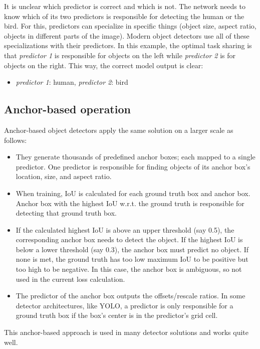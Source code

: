 It is unclear which predictor is correct and which is not. The network needs to know which of its two predictors is responsible for detecting the human or the bird. For this, predictors can specialize in specific things (object size, aspect ratio, objects in different parts of the image). Modern object detectors use all of these specializations with their predictors. In this example, the optimal task sharing is that \textit{predictor 1} is responsible for objects on the left while \textit{predictor 2} is for objects on the right. This way, the correct model output is clear:

\begin{itemize}
  \item \textit{predictor 1}: human, \textit{predictor 2}: bird
\end{itemize}

\subsection{Anchor-based operation}

Anchor-based object detectors apply the same solution on a larger scale as follows:

\begin{itemize}
  \item They generate thousands of predefined anchor boxes; each mapped to a single predictor. One predictor is responsible for finding objects of its anchor box's location, size, and aspect ratio.
  \item When training, IoU is calculated for each ground truth box and anchor box. Anchor box with the highest IoU w.r.t. the ground truth is responsible for detecting that ground truth box.
  \item If the calculated highest IoU is above an upper threshold (say 0.5), the corresponding anchor box needs to detect the object. If the highest IoU is below a lower threshold (say 0.3), the anchor box must predict no object. If none is met, the ground truth has too low maximum IoU to be positive but too high to be negative. In this case, the anchor box is ambiguous, so not used in the current loss calculation.
  \item The predictor of the anchor box outputs the offsets/rescale ratios. In some detector architectures, like YOLO, a predictor is only responsible for a ground truth box if the box's center is in the predictor's grid cell.
\end{itemize}

This anchor-based approach is used in many detector solutions and works quite well.

